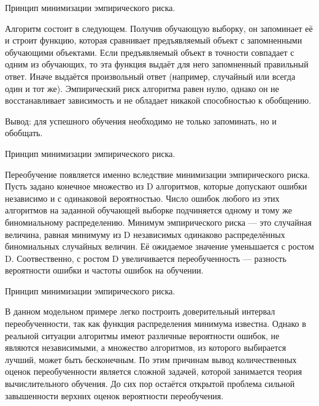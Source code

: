 \documentclass{beamer}
\begin{document}
\begin{frame}{Принцип минимизации эмпирического риска.}

Алгоритм состоит в следующем. Получив обучающую выборку, он запоминает её и строит функцию,
 которая сравнивает предъявляемый объект с запомненными обучающими объектами. 
 Если предъявляемый объект в точности совпадает с одним из обучающих, то эта функция 
 выдаёт для него запомненный правильный ответ. Иначе выдаётся произвольный ответ (например, случайный или всегда один и тот же). 
 Эмпирический риск алгоритма равен нулю, однако он не восстанавливает зависимость и не обладает никакой способностью к обобщению.

Вывод: для успешного обучения необходимо не только запоминать, но и обобщать.

\end{frame}

\begin{frame}{Принцип минимизации эмпирического риска.}


 Переобучение появляется именно вследствие минимизации эмпирического риска. Пусть задано конечное множество из D алгоритмов, 
которые допускают ошибки независимо и с одинаковой вероятностью. Число ошибок любого из этих алгоритмов 
на заданной обучающей выборке подчиняется одному и тому же биномиальному распределению.
 Минимум эмпирического риска — это случайная величина, равная минимуму из D 
 независимых одинаково распределённых биномиальных случайных величин. 
 Её ожидаемое значение уменьшается с ростом D. Соотвественно, с ростом D увеличивается 
 переобученность — разность вероятности ошибки и частоты ошибок на обучении.
 
\end{frame}

\begin{frame}{Принцип минимизации эмпирического риска.}

В данном модельном примере легко построить доверительный интервал переобученности, так как функция распределения минимума известна.
 Однако в реальной ситуации алгоритмы имеют различные вероятности ошибок, не являются независимыми,
  а множество алгоритмов, из которого выбирается лучший, может быть бесконечным.
   По этим причинам вывод количественных оценок переобученности является сложной задачей,
    которой занимается теория вычислительного обучения. До сих пор остаётся открытой 
    проблема сильной завышенности верхних оценок вероятности переобучения.
    
\end{frame}
\end{document}
